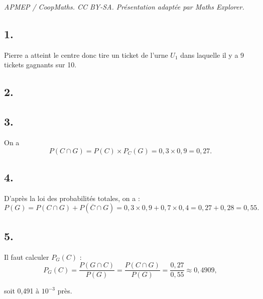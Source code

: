 \documentclass[10pt]{article}
\begin{document}
\noindent\textit{APMEP / CoopMaths. CC BY-SA. Présentation adaptée par Maths Explorer.}\par\medskip
\subsection*{1.}
	

	Pierre a atteint le centre donc tire un ticket de l’urne \(U_1\) dans laquelle il y a 9 tickets gagnants sur 10.
	
\begin{center}
\end{center}
	
	\subsection*{2.}
	

	\subsection*{3.}
	

	
	On a
	\[
	P(C \cap G) = P(C) \times P_C(G) = 0,3 \times 0,9 = 0,27.
	\]
	
	\subsection*{4.}
	

	D’après la loi des probabilités totales, on a :
	\[
	P(G) = P(C \cap G) + P(\overline{C} \cap G) = 0,3 \times 0,9 + 0,7 \times 0,4 = 0,27 + 0,28 = 0,55.
	\]
	
	\subsection*{5.}
	

	Il faut calculer \(P_G(C)\) :
	\[
	P_G(C) = \dfrac{P(G \cap C)}{P(G)} = \dfrac{P(C \cap G)}{P(G)} = \dfrac{0,27}{0,55} \approx 0,4909,
	\]
	
	soit 0,491 à \(10^{-3}\) près.
\end{document}
